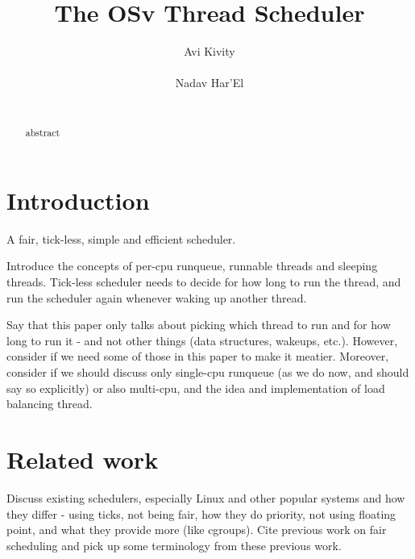 \documentclass{sig-alternate}
\begin{document}
\title{The OSv Thread Scheduler}
\author{
\alignauthor
Avi Kivity\\
   \\
\alignauthor
Nadav Har'El\\
   \\
}
\maketitle
\begin{abstract}
abstract
\end{abstract}


\section{Introduction}
A fair, tick-less, simple and efficient scheduler.

Introduce the concepts of per-cpu runqueue, runnable threads and sleeping
threads.
Tick-less scheduler needs to decide for how long to run the thread,
and run the scheduler again whenever waking up another thread.

Say that this paper only talks about picking which thread to run and for
how long to run it - and not other things (data structures, wakeups, etc.).
However, consider if we need some of those in this paper to make it meatier.
Moreover, consider if we should discuss only single-cpu runqueue (as we do
now, and should say so explicitly) or also multi-cpu, and the idea and
implementation of load balancing thread.

\section{Related work}
Discuss existing schedulers, especially Linux and other popular systems
and how they differ - using ticks, not being fair, how they do priority,
not using floating point, and what they provide more (like cgroups).
Cite previous work on fair scheduling and pick up some terminology from
these previous work.
\end{document}
